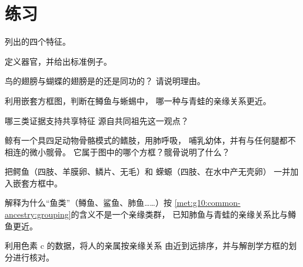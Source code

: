 \section{练习}

\begin{exercise}[$\star$]\label{exo:g10:common-ancestry:1}
列出的四个特征。
\end{exercise}

\begin{exercise}[$\star$]\label{exo:g10:common-ancestry:2}
定义器官，并给出标准例子。
\end{exercise}

\begin{exercise}[$\star$]\label{exo:g10:common-ancestry:3}
鸟的翅膀与蝴蝶的翅膀是的还是同功的？
请说明理由。
\end{exercise}

\begin{exercise}[$\star$]\label{exo:g10:common-ancestry:4}
利用嵌套方框图，判断在鳟鱼与蜥蜴中，
哪一种与青蛙的亲缘关系更近。
\end{exercise}

\begin{exercise}[$\star$]\label{exo:g10:common-ancestry:5}
哪三类证据支持共享特征
源自共同祖先这一观点？
\end{exercise}

\begin{exercise}[$\star\star$]\label{exo:g10:common-ancestry:6}
鲸有一个具四足动物骨骼模式的鳍肢，用肺呼吸，
哺乳幼体，并有与任何腿都不相连的微小髋骨。
它属于图中的哪个方框？髋骨说明了什么？
\end{exercise}

\begin{exercise}[$\star\star$]\label{exo:g10:common-ancestry:7}
把鳄鱼（四肢、羊膜卵、鳞片、无毛）和
蝾螈（四肢、在水中产无壳卵）
一并加入嵌套方框中。
\end{exercise}

\begin{exercise}[$\star\star$]\label{exo:g10:common-ancestry:8}
解释为什么“鱼类”（鳟鱼、鲨鱼、肺鱼……）按
\cref{met:g10:common-ancestry:grouping}的含义不是一个亲缘类群，
已知肺鱼与青蛙的亲缘关系比与鳟鱼更近。
\end{exercise}

\begin{exercise}[$\star\star$]\label{exo:g10:common-ancestry:9}
利用色素 c 的数据，将人的亲属按亲缘关系
由近到远排序，并与解剖学方框的划分进行核对。
\end{exercise}

